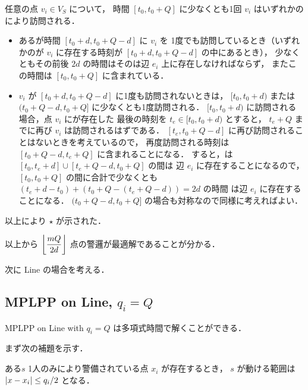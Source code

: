 任意の点 $v_i \in V_S$ について，
時間 $[t_0, t_0 + Q]$ に少なくとも1回 $v_i$ はいずれかの\server により訪問される．
\begin{itemize}
\item
ある\server が時間 $[t_0 + d, t_0 + Q - d]$ に $v_i$ を
1度でも訪問しているとき（いずれかの\server が $v_i$ に存在する時刻が
$[t_0 + d, t_0 + Q - d]$ の中にあるとき），
少なくともその前後 $2d$ の時間はその\server は辺 $e_i$ 上に存在しなければならず，
またこの時間は $[t_0, t_0 + Q]$ に含まれている．
\item 
$v_i$ が $[t_0 + d, t_0 + Q - d]$ に1度も訪問されないときは，
$[t_0, t_0 + d)$ または $(t_0 + Q - d, t_0 + Q]$ に少なくとも1度訪問される．
$[t_0, t_0 + d)$ に訪問される場合，点 $v_i$ に\server が存在した
最後の時刻を $t_e \in [t_0, t_0 + d)$ とすると，
$t_e + Q$ までに再び $v_i$ は訪問されるはずである．
$[t_e, t_0 + Q - d]$ に再び訪問されることはないときを考えているので，
再度訪問される時刻は $[t_0 + Q - d, t_e + Q]$ に含まれることになる．
すると，\server は $[t_0, t_e + d] \cup [t_e + Q - d, t_0 + Q]$ の間は
辺 $e_i$ に存在することになるので，
$[t_0, t_0 + Q]$ の間に合計で少なくとも
$(t_e + d - t_0) + (t_0 + Q - (t_e + Q - d)) = 2d$ の時間
\server は辺 $e_i$ に存在することになる．
$(t_0 + Q - d, t_0 + Q]$ の場合も対称なので同様に考えればよい．
\end{itemize}
以上により $\star$ が示された．






以上から $\left\lfloor{\dfrac{mQ}{2d}}\right\rfloor$ 点の警邏が最適解であることが分かる．





次に Line の場合を考える．


\subsection{MPLPP on Line, $q_i = Q$}

\begin{theo}
	\label{theo:MPLPPonLine_1}
	MPLPP on Line with $q_i = Q$ は多項式時間で解くことができる．
\end{theo}



まず次の補題を示す．

\begin{lemm}
	\label{lemm:MPLPPonLine_3}
	ある\server $s$ 1人のみにより警備されている点 $x_i$ が存在するとき，
	$s$ が動ける範囲は $|{ x - x_i }| \leq q_i / 2$ となる．
\end{lemm}

